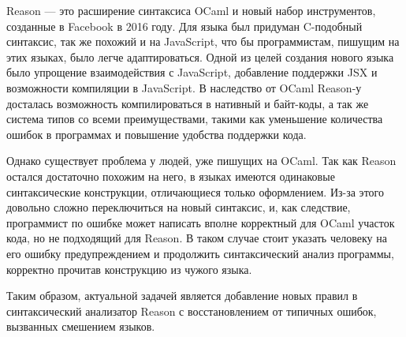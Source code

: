 Reason --- это расширение синтаксиса OCaml и новый набор инструментов, созданные в Facebook в 2016 году. Для языка был придуман C-подобный синтаксис, так же похожий и на JavaScript, что бы программистам, пишущим на этих языках, было легче адаптироваться\cite{RE}. Одной из целей создания нового языка было упрощение взаимодействия с JavaScript, добавление поддержки JSX и возможности компиляции в JavaScript\cite{WE}. В наследство от OCaml Reason-у досталась возможность компилироваться в нативный и байт-коды, а так же система типов со всеми преимуществами, такими как уменьшение количества ошибок в программах и повышение удобства поддержки кода.

Однако существует проблема у людей, уже пишущих на OCaml. Так как Reason остался достаточно похожим на него, в языках имеются одинаковые синтаксические конструкции, отличающиеся только оформлением. Из-за этого довольно сложно переключиться на новый синтаксис, и, как следствие, программист по ошибке может написать вполне корректный для OCaml участок кода, но не подходящий для Reason. В таком случае стоит указать человеку на его ошибку предупреждением и продолжить синтаксический анализ программы, корректно прочитав конструкцию из чужого языка.

Таким образом, актуальной задачей является добавление новых правил в синтаксический анализатор Reason с восстановлением от типичных ошибок, вызванных смешением языков.